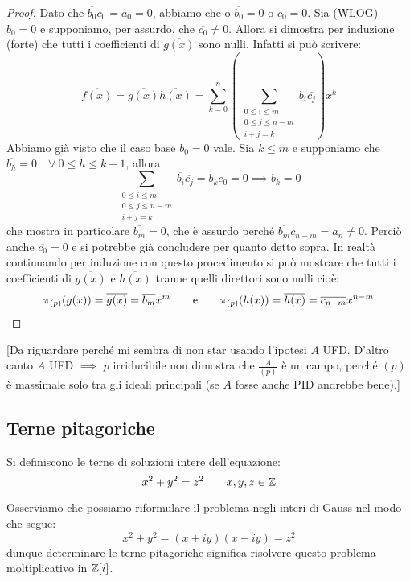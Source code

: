 \documentclass[11pt]{scrartcl}
\begin{document}
\begin{proof}
    Dato che $\overline{b_0}\overline{c_0} = \overline{a_0} = 0$, abbiamo che o $\overline{b_0} = 0$ o $\overline{c_0} = 0$.
    Sia (WLOG) $\overline{b_0} = 0$ e supponiamo, per assurdo, che $\overline{c_0} \neq 0$. 
    Allora si dimostra per induzione (forte) che tutti i coefficienti di $\overline{g(x)}$ sono nulli. Infatti si può scrivere: 
        \[ \overline{f(x)} = \overline{g(x)}\overline{h(x)} = 
	   \sum_{k = 0}^{n} ( \sum_{\substack{0 \leq i \leq m \\ 0 \leq j \leq n-m \\ i+j = k}} \overline{b_i}\overline{c_j} )x^k
            \]
    Abbiamo già visto che il caso base $\overline{b_0} = 0$ vale. Sia $k \leq m$ e supponiamo che $\overline{b_h} = 0 \quad \forall ~ 0 \leq h \leq k-1$, allora 
        \[ \sum_{\substack{0 \leq i \leq m \\ 0 \leq j \leq n-m \\ i+j = k}} \overline{b_i}\overline{c_j} 
	   = b_{k}c_0 = 0 \implies b_{k} = 0
            \]
    che mostra in particolare $\overline{b_m} = 0$, che è assurdo perché $\overline{b_m}\overline{c_{n-m}} = \overline{a_n} \neq 0$.
    Perciò anche $\overline{c_0} = 0$ e si potrebbe già concludere per quanto detto sopra. 
    In realtà continuando per induzione con questo procedimento si può mostrare che tutti i coefficienti di $\overline{g(x)}$ e $\overline{h(x)}$ tranne quelli direttori sono nulli cioè: 
        \[ \pi_{(p)}(g(x)) = \overline{g(x)} = \overline{b_m}x^m 
	   \qquad \text e \qquad 
	   \pi_{(p)}(h(x)) = \overline{h(x)} = \overline{c_{n-m}}x^{n-m}
            \]
\end{proof}
[Da riguardare perché mi sembra di non star usando l'ipotesi $A$ UFD. 
D'altro canto $A$ UFD $\implies$ $p$ irriducibile non dimostra che $\displaystyle \frac{A}{(p)}$ è un campo,
perché $(p)$ è massimale solo tra gli ideali principali (se $A$ fosse anche PID andrebbe bene).]

\newpage
\subsection{Terne pitagoriche}
\begin{definition}
    Si definiscono  le terne di soluzioni intere dell'equazione:
    \[ x^2 + y^2 = z^2 \qquad x,y,z \in \mathbb Z
        \]
\end{definition}

Osserviamo che possiamo riformulare il problema negli interi di Gauss nel modo che segue:
\[ x^2+y^2 = (x+iy)(x-iy) = z^2
    \]
dunque determinare le terne pitagoriche significa risolvere questo problema moltiplicativo in $\mathbb Z[i]$.
\end{document}
